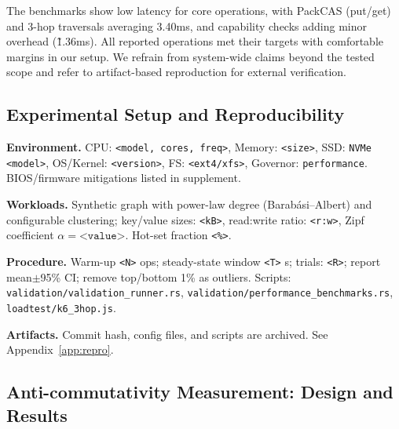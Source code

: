 \documentclass[10pt]{article}
\begin{document}
The benchmarks show low latency for core operations, with PackCAS (put/get) and 3-hop traversals averaging 3.40ms, and capability checks adding minor overhead (\~1.36ms). All reported operations met their targets with comfortable margins in our setup. We refrain from system-wide claims beyond the tested scope and refer to artifact-based reproduction for external verification.

\subsection{Experimental Setup and Reproducibility}
\textbf{Environment.} CPU: \texttt{<model, cores, freq>}, Memory: \texttt{<size>}, SSD: \texttt{NVMe <model>}, OS/Kernel: \texttt{<version>}, FS: \texttt{<ext4/xfs>}, Governor: \texttt{performance}. BIOS/firmware mitigations listed in supplement.

\textbf{Workloads.} Synthetic graph with power-law degree (Barab\'asi--Albert) and configurable clustering; key/value sizes: \texttt{<kB>}, read:write ratio: \texttt{<r:w>}, Zipf coefficient $\alpha=\texttt{<value>}$. Hot-set fraction \texttt{<\%>}.

\textbf{Procedure.} Warm-up \texttt{<N>} ops; steady-state window \texttt{<T>} s; trials: \texttt{<R>}; report mean$\pm$95\% CI; remove top/bottom 1\% as outliers. Scripts: \texttt{validation/validation_runner.rs}, \texttt{validation/performance_benchmarks.rs}, \texttt{loadtest/k6_3hop.js}.

\textbf{Artifacts.} Commit hash, config files, and scripts are archived. See Appendix~\ref{app:repro}.

\subsection{Anti-commutativity Measurement: Design and Results}
\end{document}
